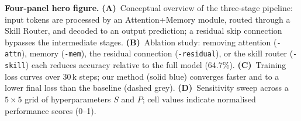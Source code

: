 \caption{\textbf{Four-panel hero figure.}
\textbf{(A)}~Conceptual overview of the three-stage pipeline: input tokens are processed by an
Attention+Memory module, routed through a Skill Router, and decoded to an output prediction;
a residual skip connection bypasses the intermediate stages.
\textbf{(B)}~Ablation study: removing attention (\texttt{-attn}), memory (\texttt{-mem}),
the residual connection (\texttt{-residual}), or the skill router (\texttt{-skill}) each
reduces accuracy relative to the full model (64.7\%).
\textbf{(C)}~Training loss curves over 30\,k steps; our method (solid blue) converges
faster and to a lower final loss than the baseline (dashed grey).
\textbf{(D)}~Sensitivity sweep across a $5\times5$ grid of hyperparameters $S$ and $P$;
cell values indicate normalised performance scores (0--1).}
